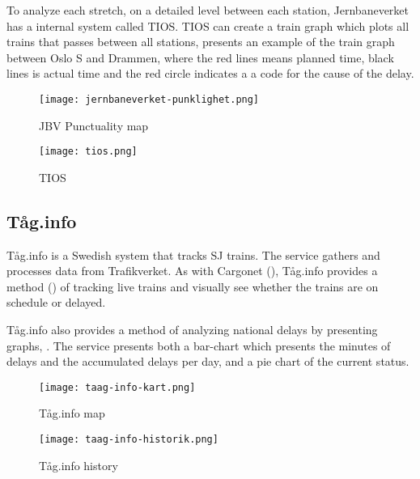 To analyze each stretch, on a detailed level between each station,
Jernbaneverket has a internal system called TIOS.
TIOS can create a train graph which plots all trains that passes between all 
stations,  presents an example of the train graph 
between Oslo S and Drammen, where the red lines means planned time, black 
lines is actual time and the red circle indicates a a code for the cause of 
the delay. 

\begin{figure}[!htbp]
	\texttt{[image: jernbaneverket-punklighet.png]}
	\caption[JBV Punctuality map]{JBV Punctuality map \cite{jernbaneverketPunklighetKart}}
	\label{fig:jernbaneverket-punklighet}
\end{figure}
\begin{figure}[!htbp]
	\texttt{[image: tios.png]}
	\caption[TIOS]{TIOS\cite{jernbaneverketAbout}}
	\label{fig:jernbaneverket-tios}
\end{figure}

\subsection{Tåg.info}
\label{sub:subsection_taag.info}

Tåg.info\cite{taagInfo} is a Swedish system that tracks SJ\cite{svenskaJernban}
trains. The service gathers and processes data from Trafikverket\cite{trafikverket}. As with Cargonet (),
Tåg.info provides a method () of tracking live trains and visually see whether the trains are on schedule or delayed. 

Tåg.info also provides a method of analyzing national delays by presenting
graphs, . The service presents both a bar-chart
which presents the minutes of delays and the accumulated delays per day, and a
pie chart of the current status.

\begin{figure}[!htbp]
	\texttt{[image: taag-info-kart.png]}
	\caption[Tåg.info map]{Tåg.info map
	\cite{taagInfo}}
	\label{fig:taag-info-kart}
\end{figure}

\begin{figure}[!htbp]
	\texttt{[image: taag-info-historik.png]}
	\caption[Tåg.info history]{Tåg.info history
	\cite{taagInfo}}
	\label{fig:taag-info-historik}
\end{figure}


